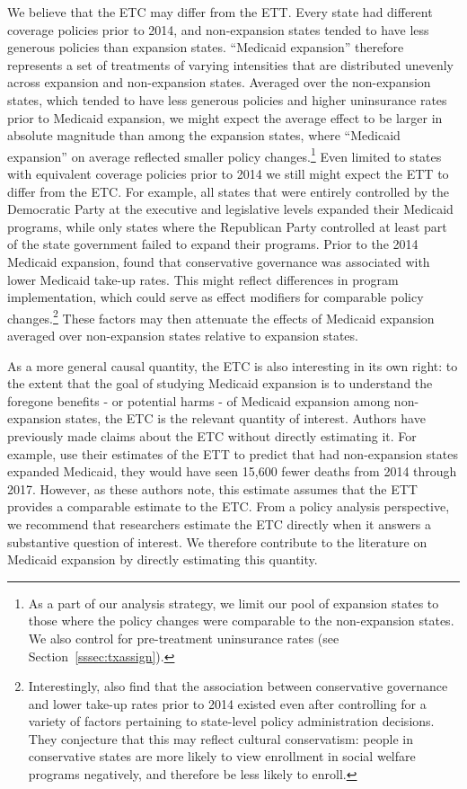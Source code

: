 \documentclass[aoas]{imsart}
\theoremstyle{plain}
\theoremstyle{remark}
\begin{document}
We believe that the ETC may differ from the ETT. Every state had different coverage policies prior to 2014, and non-expansion states tended to have less generous policies than expansion states. ``Medicaid expansion'' therefore represents a set of treatments of varying intensities that are distributed unevenly across expansion and non-expansion states. Averaged over the non-expansion states, which tended to have less generous policies and higher uninsurance rates prior to Medicaid expansion, we might expect the average effect to be larger in absolute magnitude than among the expansion states, where ``Medicaid expansion'' on average reflected smaller policy changes.\footnote{As a part of our analysis strategy, we limit our pool of expansion states to those where the policy changes were comparable to the non-expansion states. We also control for pre-treatment uninsurance rates (see Section~\ref{sssec:txassign}).} Even limited to states with equivalent coverage policies prior to 2014 we still might expect the ETT to differ from the ETC. For example, all states that were entirely controlled by the Democratic Party at the executive and legislative levels expanded their Medicaid programs, while only states where the Republican Party controlled at least part of the state government failed to expand their programs. Prior to the 2014 Medicaid expansion, \cite{sommers2012understanding} found that conservative governance was associated with lower Medicaid take-up rates. This might reflect differences in program implementation, which could serve as effect modifiers for comparable policy changes.\footnote{Interestingly, \cite{sommers2012understanding} also find that the association between conservative governance and lower take-up rates prior to 2014 existed even after controlling for a variety of factors pertaining to state-level policy administration decisions. They conjecture that this may reflect cultural conservatism: people in conservative states are more likely to view enrollment in social welfare programs negatively, and therefore be less likely to enroll.} These factors may then attenuate the effects of Medicaid expansion averaged over non-expansion states relative to expansion states.

As a more general causal quantity, the ETC is also interesting in its own right: to the extent that the goal of studying Medicaid expansion is to understand the foregone benefits - or potential harms - of Medicaid expansion among non-expansion states, the ETC is the relevant quantity of interest. Authors have previously made claims about the ETC without directly estimating it. For example, \cite{miller2021medicaid} use their estimates of the ETT to predict that had non-expansion states expanded Medicaid, they would have seen 15,600 fewer deaths from 2014 through 2017. However, as these authors note, this estimate assumes that the ETT provides a comparable estimate to the ETC. From a policy analysis perspective, we recommend that researchers estimate the ETC directly when it answers a substantive question of interest. We therefore contribute to the literature on Medicaid expansion by directly estimating this quantity.
\end{document}
